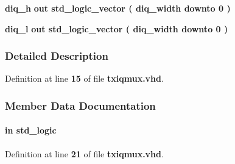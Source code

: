 \begin{DoxyCompactItemize}
\item 
{\bf diq\+\_\+h}  {\bfseries {\bfseries \textcolor{keywordflow}{out}\textcolor{vhdlchar}{ }}} {\bfseries \textcolor{comment}{std\+\_\+logic\+\_\+vector}\textcolor{vhdlchar}{ }\textcolor{vhdlchar}{(}\textcolor{vhdlchar}{ }\textcolor{vhdlchar}{ }\textcolor{vhdlchar}{ }\textcolor{vhdlchar}{ }{\bfseries {\bf diq\+\_\+width}} \textcolor{vhdlchar}{ }\textcolor{keywordflow}{downto}\textcolor{vhdlchar}{ }\textcolor{vhdlchar}{ } \textcolor{vhdldigit}{0} \textcolor{vhdlchar}{ }\textcolor{vhdlchar}{)}\textcolor{vhdlchar}{ }} 
\item 
{\bf diq\+\_\+l}  {\bfseries {\bfseries \textcolor{keywordflow}{out}\textcolor{vhdlchar}{ }}} {\bfseries \textcolor{comment}{std\+\_\+logic\+\_\+vector}\textcolor{vhdlchar}{ }\textcolor{vhdlchar}{(}\textcolor{vhdlchar}{ }\textcolor{vhdlchar}{ }\textcolor{vhdlchar}{ }\textcolor{vhdlchar}{ }{\bfseries {\bf diq\+\_\+width}} \textcolor{vhdlchar}{ }\textcolor{keywordflow}{downto}\textcolor{vhdlchar}{ }\textcolor{vhdlchar}{ } \textcolor{vhdldigit}{0} \textcolor{vhdlchar}{ }\textcolor{vhdlchar}{)}\textcolor{vhdlchar}{ }} 
\end{DoxyCompactItemize}


\subsubsection{Detailed Description}


Definition at line {\bf 15} of file {\bf txiqmux.\+vhd}.



\subsubsection{Member Data Documentation}
\paragraph[{clk}]{ {\bfseries \textcolor{keywordflow}{in}\textcolor{vhdlchar}{ }} {\bfseries \textcolor{comment}{std\+\_\+logic}\textcolor{vhdlchar}{ }} \hspace{0.3cm}{\ttfamily [Port]}}\label{classtxiqmux_a4a4609c199d30b3adebbeb3a01276ec5}


Definition at line {\bf 21} of file {\bf txiqmux.\+vhd}.

